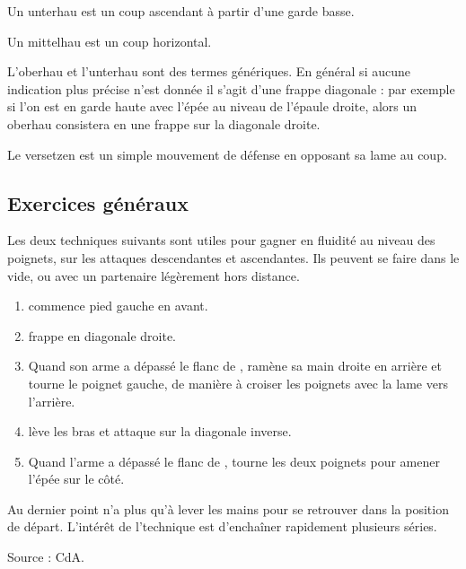 \begin{coup}
\label{épée-longue:coup:unterhau}

Un unterhau est un coup ascendant à partir d'une garde basse.

\end{coup}

\begin{coup}
\label{épée-longue:coup:mittelhau}

Un mittelhau est un coup horizontal.

\end{coup}

L'oberhau et l'unterhau sont des termes génériques.
En général si aucune indication plus précise n'est donnée il s'agit d'une frappe diagonale : par exemple si l'on est en garde haute avec l'épée au niveau de l'épaule droite, alors un oberhau consistera en une frappe sur la diagonale droite.

\begin{garde}[Versetzen]

Le versetzen est un simple mouvement de défense en opposant sa lame au coup.

\end{garde}


\subsection{Exercices généraux}


Les deux techniques suivants sont utiles pour gagner en fluidité au niveau des poignets, sur les attaques descendantes et ascendantes. Ils peuvent se faire dans le vide, ou avec un partenaire légèrement hors distance.

\begin{exercice}

\begin{enumerate}
	\item \A commence pied gauche en avant.
	\item \A frappe en diagonale droite.
	\item Quand son arme a dépassé le flanc de \D, \A ramène sa main droite en arrière et tourne le poignet gauche, de manière à croiser les poignets avec la lame vers l'arrière.
	\item \A lève les bras et attaque sur la diagonale inverse.
	\item Quand l'arme a dépassé le flanc de \D, \A tourne les deux poignets pour amener l'épée sur le côté.
\end{enumerate}

Au dernier point \A n'a plus qu'à lever les mains pour se retrouver dans la position de départ. L'intérêt de l'technique est d'enchaîner rapidement plusieurs séries.

Source : CdA.
\end{exercice}



